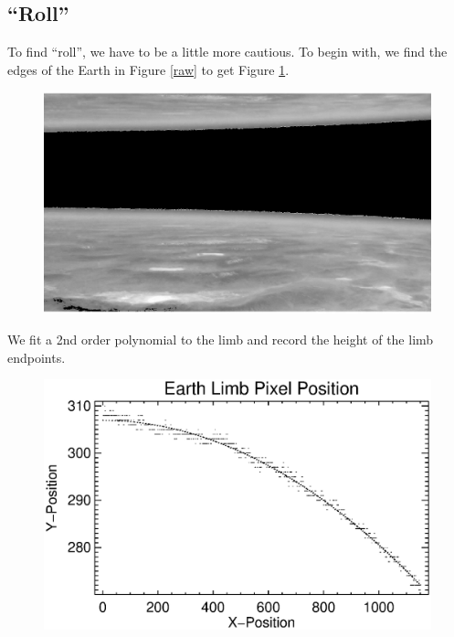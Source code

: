 \documentclass[10pt]{scrartcl}
\begin{document}

\subsection{``Roll''} %
\label{sub:roll}

To find ``roll'', we have to be a little more cautious. To begin with, we find the edges of the Earth in Figure \ref{raw} to get Figure \ref{earthlimb}.

\begin{figure}[!h]
    \centering
    \includegraphics[width=.9\textwidth]{../plots_tables_images/ama.eps}
    \label{earthlimb}
\end{figure}

We fit a 2nd order polynomial to the limb and record the height of the limb endpoints. 

\begin{figure}[!h]
    \centering
    \includegraphics[width=.9\textwidth]{../plots_tables_images/earth_limb.eps}
    \label{limbfit}
\end{figure}
\end{document}
